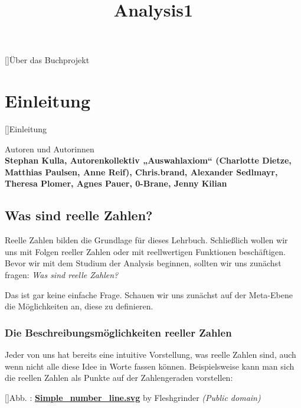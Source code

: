 \documentclass[fontsize=9pt,
               parskip=half-,
               DIV=14,
               listof=chapterentry,
               tocflat]{scrbook}
\title{Analysis1}
\date{}
\newcounter{imagelabel}
\newenvironment{authors}{\par\vspace*{\fill}\color{white}Autoren und
Autorinnen\\\bfseries}{\clearpage}
\newcommand{\ColoredTOC}{{\color{Black}\setcounter{tocdepth}{0}\tableofcontents}}
\begin{document}
\sloppy

\clearpage%
\thispagestyle{empty}%
\null%
\clearpage



[]{Über das Buchprojekt}\ColoredTOC

\newpage

\part{Einleitung}

[]{Einleitung}\begin{authors}
Stephan Kulla, Autorenkollektiv „Auswahlaxiom“ (Charlotte Dietze, Matthias Paulsen, Anne Reif), Chris.brand, Alexander Sedlmayr, Theresa Plomer, Agnes Pauer, 0-Brane, Jenny Kilian\end{authors}

\chapter{Was sind reelle Zahlen?}

Reelle Zahlen bilden die Grundlage für dieses Lehrbuch. Schließlich wollen wir uns mit Folgen reeller Zahlen oder mit reellwertigen Funktionen beschäftigen. Bevor wir mit dem Studium der Analysis beginnen, sollten wir uns zunächst fragen: \emph{Was sind reelle Zahlen?}

Das ist gar keine einfache Frage. Schauen wir uns zunächst auf der Meta-Ebene die Möglichkeiten an, diese zu definieren.

\section{Die Beschreibungsmöglichkeiten reeller Zahlen}

Jeder von uns hat bereits eine intuitive Vorstellung, was reelle Zahlen sind, auch wenn nicht alle diese Idee in Worte fassen können. Beispielsweise kann man sich die reellen Zahlen als Punkte auf der Zahlengeraden vorstellen:

[]{Abb. : \protect\href{https://commons.wikimedia.org/wiki/File:Simple_number_line.svg}{\textbf{Simple\allowbreak\_number\allowbreak\_line.svg}} by Fleshgrinder \textit{(Public domain)}}\begin{center}
\end{center}
\end{document}
